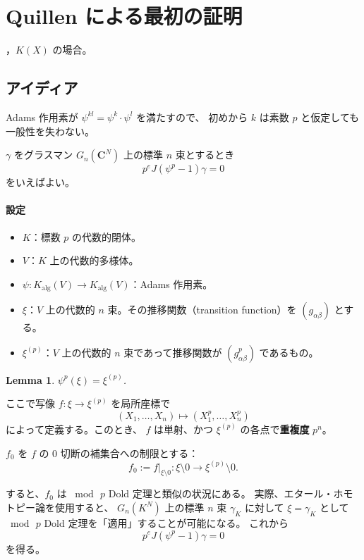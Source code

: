 \documentclass[uplatex,dvipdfmx,a4paper,12pt]{jlreq}
\newtheorem{lemma}[theorem]{Lemma}
\newcommand{\C}{\mathbf{C}}
\begin{document}
\section{Quillen による最初の証明}

\cite{Q68}，$K(X)$ の場合。

\subsection{アイディア}

Adams 作用素が $\psi^{kl} = \psi^k \cdot \psi^l$ を満たすので、
初めから $k$ は素数 $p$ と仮定しても一般性を失わない。

$\gamma$ をグラスマン $G_n(\C^N)$ 上の標準 $n$ 束とするとき
\[
  p^e J(\psi^p - 1)\gamma = 0
\]
をいえばよい。

\paragraph{設定}
\begin{itemize}
  \item $K$：標数 $p$ の代数的閉体。
  \item $V$：$K$ 上の代数的多様体。
  \item $\psi : K_{\mathrm{alg}}(V) \to K_{\mathrm{alg}}(V)$：Adams 作用素。
  \item $\xi$：$V$ 上の代数的 $n$ 束。その推移関数（transition function）を
        $(g_{\alpha\beta})$ とする。
  \item $\xi^{(p)}$：$V$ 上の代数的 $n$ 束であって推移関数が $(g_{\alpha\beta}^p)$
        であるもの。
\end{itemize}

\begin{lemma}
  $\psi^p(\xi) = \xi^{(p)}$.
\end{lemma}

ここで写像 $f : \xi \to \xi^{(p)}$ を局所座標で
\[
  (X_1, \ldots, X_n) \mapsto (X_1^p, \ldots, X_n^p)
\]
によって定義する。このとき、
$f$ は単射、かつ $\xi^{(p)}$ の各点で\textbf{重複度} $p^n$。

$f_0$ を $f$ の $0$ 切断の補集合への制限とする：
\[
  f_0 := f|_{\xi \setminus 0} : \xi \setminus 0 \longrightarrow \xi^{(p)} \setminus 0.
\]

すると、$f_0$ は $\bmod\, p$ Dold 定理と類似の状況にある。
実際、エタール・ホモトピー論を使用すると、
$G_n(K^N)$ 上の標準 $n$ 束 $\gamma_K$ に対して
$\xi = \gamma_K$ として $\bmod\, p$ Dold 定理を「適用」することが可能になる。
これから
\[
  p^e J(\psi^p - 1)\gamma = 0
\]
を得る。
\end{document}
